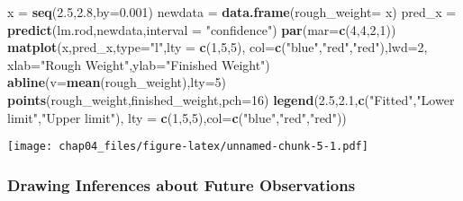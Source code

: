 \documentclass[]{article}
\newenvironment{Shaded}{\begin{snugshade}}{\end{snugshade}}
\newcommand{\DataTypeTok}[1]{\textcolor[rgb]{0.13,0.29,0.53}{#1}}
\newcommand{\DecValTok}[1]{\textcolor[rgb]{0.00,0.00,0.81}{#1}}
\newcommand{\FloatTok}[1]{\textcolor[rgb]{0.00,0.00,0.81}{#1}}
\newcommand{\KeywordTok}[1]{\textcolor[rgb]{0.13,0.29,0.53}{\textbf{#1}}}
\newcommand{\NormalTok}[1]{#1}
\newcommand{\StringTok}[1]{\textcolor[rgb]{0.31,0.60,0.02}{#1}}
\begin{document}
\begin{Shaded}
\begin{Highlighting}[]
\NormalTok{x =}\StringTok{ }\KeywordTok{seq}\NormalTok{(}\FloatTok{2.5}\NormalTok{,}\FloatTok{2.8}\NormalTok{,}\DataTypeTok{by=}\FloatTok{0.001}\NormalTok{)}
\NormalTok{newdata =}\StringTok{ }\KeywordTok{data.frame}\NormalTok{(}\DataTypeTok{rough_weight=}\NormalTok{ x)}
\NormalTok{pred_x =}\StringTok{ }\KeywordTok{predict}\NormalTok{(lm.rod,newdata,}\DataTypeTok{interval =} \StringTok{"confidence"}\NormalTok{)}
\KeywordTok{par}\NormalTok{(}\DataTypeTok{mar=}\KeywordTok{c}\NormalTok{(}\DecValTok{4}\NormalTok{,}\DecValTok{4}\NormalTok{,}\DecValTok{2}\NormalTok{,}\DecValTok{1}\NormalTok{))}
\KeywordTok{matplot}\NormalTok{(x,pred_x,}\DataTypeTok{type=}\StringTok{"l"}\NormalTok{,}\DataTypeTok{lty =} \KeywordTok{c}\NormalTok{(}\DecValTok{1}\NormalTok{,}\DecValTok{5}\NormalTok{,}\DecValTok{5}\NormalTok{),}
        \DataTypeTok{col=}\KeywordTok{c}\NormalTok{(}\StringTok{"blue"}\NormalTok{,}\StringTok{"red"}\NormalTok{,}\StringTok{"red"}\NormalTok{),}\DataTypeTok{lwd=}\DecValTok{2}\NormalTok{,}
        \DataTypeTok{xlab=}\StringTok{"Rough Weight"}\NormalTok{,}\DataTypeTok{ylab=}\StringTok{"Finished Weight"}\NormalTok{)}
\KeywordTok{abline}\NormalTok{(}\DataTypeTok{v=}\KeywordTok{mean}\NormalTok{(rough_weight),}\DataTypeTok{lty=}\DecValTok{5}\NormalTok{)}
\KeywordTok{points}\NormalTok{(rough_weight,finished_weight,}\DataTypeTok{pch=}\DecValTok{16}\NormalTok{)}
\KeywordTok{legend}\NormalTok{(}\FloatTok{2.5}\NormalTok{,}\FloatTok{2.1}\NormalTok{,}\KeywordTok{c}\NormalTok{(}\StringTok{"Fitted"}\NormalTok{,}\StringTok{"Lower limit"}\NormalTok{,}\StringTok{"Upper limit"}\NormalTok{),}
       \DataTypeTok{lty =} \KeywordTok{c}\NormalTok{(}\DecValTok{1}\NormalTok{,}\DecValTok{5}\NormalTok{,}\DecValTok{5}\NormalTok{),}\DataTypeTok{col=}\KeywordTok{c}\NormalTok{(}\StringTok{"blue"}\NormalTok{,}\StringTok{"red"}\NormalTok{,}\StringTok{"red"}\NormalTok{))}
\end{Highlighting}
\end{Shaded}

\texttt{[image: chap04\_files/figure-latex/unnamed-chunk-5-1.pdf]}

\hypertarget{drawing-inferences-about-future-observations}{%
\subsubsection{Drawing Inferences about Future
Observations}\label{drawing-inferences-about-future-observations}}
\end{document}
